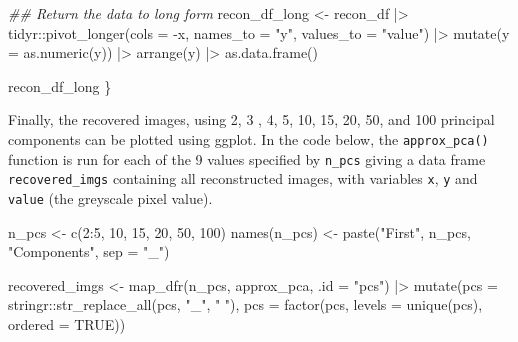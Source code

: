 \documentclass[
  letterpaper,
  10pt,
  krantz2]{krantz}
\makeatletter
\newenvironment{Shaded}{\begin{snugshade}}{\end{snugshade}}
\newcommand{\AttributeTok}[1]{\textcolor[rgb]{0.40,0.45,0.13}{#1}}
\newcommand{\ConstantTok}[1]{\textcolor[rgb]{0.56,0.35,0.01}{#1}}
\newcommand{\DecValTok}[1]{\textcolor[rgb]{0.68,0.00,0.00}{#1}}
\newcommand{\DocumentationTok}[1]{\textcolor[rgb]{0.37,0.37,0.37}{\textit{#1}}}
\newcommand{\FunctionTok}[1]{\textcolor[rgb]{0.28,0.35,0.67}{#1}}
\newcommand{\NormalTok}[1]{\textcolor[rgb]{0.00,0.23,0.31}{#1}}
\newcommand{\OtherTok}[1]{\textcolor[rgb]{0.00,0.23,0.31}{#1}}
\newcommand{\SpecialCharTok}[1]{\textcolor[rgb]{0.37,0.37,0.37}{#1}}
\newcommand{\StringTok}[1]{\textcolor[rgb]{0.13,0.47,0.30}{#1}}
\newenvironment{kframe}{%
  \medskip{}
  \setlength{\fboxsep}{.8em}
  \def\at@end@of@kframe{}%
  \ifinner\ifhmode%
  \def\at@end@of@kframe{\end{minipage}}%
  \begin{minipage}{\columnwidth}%
  \fi\fi%
  \def\FrameCommand##1{\hskip\@totalleftmargin \hskip-\fboxsep
  \colorbox{shadecolor}{##1}\hskip-\fboxsep
      \hskip-\linewidth \hskip-\@totalleftmargin \hskip\columnwidth}%
  \MakeFramed {\advance\hsize-\width
    \@totalleftmargin\z@ \linewidth\hsize
    \@setminipage}}%
{\par\unskip\endMakeFramed%
  \at@end@of@kframe}
\renewenvironment{Shaded}{\begin{kframe}}{\end{kframe}}
\makeatother
\begin{document}
\begin{Shaded}
\begin{Highlighting}[]
  \DocumentationTok{\#\# Return the data to long form }
\NormalTok{  recon\_df\_long }\OtherTok{\textless{}{-}}\NormalTok{ recon\_df }\SpecialCharTok{|\textgreater{}}
\NormalTok{    tidyr}\SpecialCharTok{::}\FunctionTok{pivot\_longer}\NormalTok{(}\AttributeTok{cols =} \SpecialCharTok{{-}}\NormalTok{x, }
                        \AttributeTok{names\_to =} \StringTok{"y"}\NormalTok{, }
                        \AttributeTok{values\_to =} \StringTok{"value"}\NormalTok{) }\SpecialCharTok{|\textgreater{}}
    \FunctionTok{mutate}\NormalTok{(}\AttributeTok{y =} \FunctionTok{as.numeric}\NormalTok{(y)) }\SpecialCharTok{|\textgreater{}}
    \FunctionTok{arrange}\NormalTok{(y) }\SpecialCharTok{|\textgreater{}}
    \FunctionTok{as.data.frame}\NormalTok{()}
  
\NormalTok{  recon\_df\_long}
\NormalTok{\}}
\end{Highlighting}
\end{Shaded}

Finally, the recovered images, using 2, 3 , 4, 5, 10, 15, 20, 50, and
100 principal components can be plotted using ggplot. In the code below,
the \texttt{approx\_pca()} function is run for each of the 9 values
specified by \texttt{n\_pcs} giving a data frame
\texttt{recovered\_imgs} containing all reconstructed images, with
variables \texttt{x}, \texttt{y} and \texttt{value} (the greyscale pixel
value).

\begin{Shaded}
\begin{Highlighting}[]
\NormalTok{n\_pcs }\OtherTok{\textless{}{-}} \FunctionTok{c}\NormalTok{(}\DecValTok{2}\SpecialCharTok{:}\DecValTok{5}\NormalTok{, }\DecValTok{10}\NormalTok{, }\DecValTok{15}\NormalTok{, }\DecValTok{20}\NormalTok{, }\DecValTok{50}\NormalTok{, }\DecValTok{100}\NormalTok{)}
\FunctionTok{names}\NormalTok{(n\_pcs) }\OtherTok{\textless{}{-}} \FunctionTok{paste}\NormalTok{(}\StringTok{"First"}\NormalTok{, n\_pcs, }\StringTok{"Components"}\NormalTok{, }\AttributeTok{sep =} \StringTok{"\_"}\NormalTok{)}

\NormalTok{recovered\_imgs }\OtherTok{\textless{}{-}} \FunctionTok{map\_dfr}\NormalTok{(n\_pcs, }
\NormalTok{                          approx\_pca, }
                          \AttributeTok{.id =} \StringTok{"pcs"}\NormalTok{) }\SpecialCharTok{|\textgreater{}}
  \FunctionTok{mutate}\NormalTok{(}\AttributeTok{pcs =}\NormalTok{ stringr}\SpecialCharTok{::}\FunctionTok{str\_replace\_all}\NormalTok{(pcs, }\StringTok{"\_"}\NormalTok{, }\StringTok{" "}\NormalTok{), }
         \AttributeTok{pcs =} \FunctionTok{factor}\NormalTok{(pcs, }\AttributeTok{levels =} \FunctionTok{unique}\NormalTok{(pcs), }\AttributeTok{ordered =} \ConstantTok{TRUE}\NormalTok{))}
\end{Highlighting}
\end{Shaded}
\end{document}
